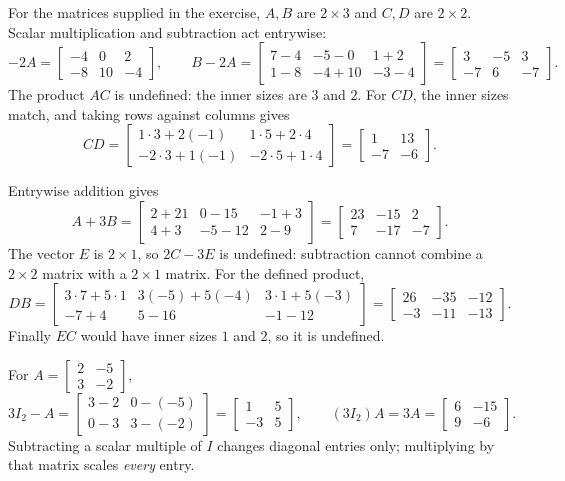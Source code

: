 For the matrices supplied in the exercise, $A,B$ are $2\times3$ and
$C,D$ are $2\times2$. Scalar multiplication and subtraction act entrywise:
\[
 -2A=\begin{bmatrix}-4&0&2\\-8&10&-4\end{bmatrix},\qquad
 B-2A=\begin{bmatrix}7-4&-5-0&1+2\\1-8&-4+10&-3-4\end{bmatrix}
 =\begin{bmatrix}3&-5&3\\-7&6&-7\end{bmatrix}.
\]
The product $AC$ is undefined: the inner sizes are $3$ and $2$.
For $CD$, the inner sizes match, and taking rows against columns gives
\[
 CD=\begin{bmatrix}1\cdot3+2(-1)&1\cdot5+2\cdot4\\
 -2\cdot3+1(-1)&-2\cdot5+1\cdot4\end{bmatrix}
 =\begin{bmatrix}1&13\\-7&-6\end{bmatrix}.
\]

Entrywise addition gives
\[
 A+3B=\begin{bmatrix}2+21&0-15&-1+3\\4+3&-5-12&2-9\end{bmatrix}
 =\begin{bmatrix}23&-15&2\\7&-17&-7\end{bmatrix}.
\]
The vector $E$ is $2\times1$, so $2C-3E$ is undefined: subtraction cannot
combine a $2\times2$ matrix with a $2\times1$ matrix. For the defined product,
\[
 DB=\begin{bmatrix}
 3\cdot7+5\cdot1&3(-5)+5(-4)&3\cdot1+5(-3)\\
 -7+4&5-16&-1-12
 \end{bmatrix}
 =\begin{bmatrix}26&-35&-12\\-3&-11&-13\end{bmatrix}.
\]
Finally $EC$ would have inner sizes $1$ and $2$, so it is undefined.

For $A=\begin{bmatrix}2&-5\\3&-2\end{bmatrix}$,
\[
 3I_2-A=\begin{bmatrix}3-2&0-(-5)\\0-3&3-(-2)\end{bmatrix}
 =\begin{bmatrix}1&5\\-3&5\end{bmatrix},\qquad
 (3I_2)A=3A=\begin{bmatrix}6&-15\\9&-6\end{bmatrix}.
\]
Subtracting a scalar multiple of $I$ changes diagonal entries only;
multiplying by that matrix scales \emph{every} entry.

